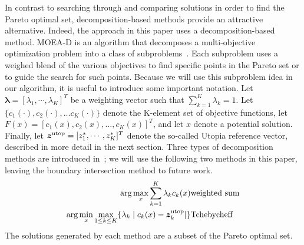 \documentclass{article}
\begin{document}
In contrast to searching through and comparing solutions in order to find the Pareto optimal set, decomposition-based methods provide an attractive alternative.  
Indeed, the approach in this paper uses a decomposition-based method.  
MOEA-D is an algorithm that decomposes a multi-objective optimization problem into a class of subproblems~\cite{4358754}.  
Each subproblem uses a weighed blend of the various objectives to find specific points in the Pareto set or to guide the search for such points.  
Because we  will use this subproblem idea in our algorithm, it is useful to introduce some important notation.
Let $ \bm{\lambda} = [ \lambda_{1} , \cdots , \lambda_{K}  ]^{T} $ be a weighting vector such that $ \sum_{k=1}^{K} \lambda_{k} = 1 $.  Let $\{c_{1}(\cdot), c_{2}(\cdot), \ldots c_{K}(\cdot)\}$ denote the K-element set of objective functions, let $F(x) = [c_{1}(x), c_{2}(x), \ldots, c_{K}(x)]^T$, and let $x$ denote a potential solution.  Finally, let $ \bm{z}^{\rm utop} = [z^{*}_{1}, \cdots , z^{*}_{K}]^{T} $ denote the so-called Utopia reference vector, described in more detail in the next section. 
Three types of decomposition methods are introduced in~\cite{4358754}; we will use the following two methods in this paper, leaving the boundary intersection method to future work.
\begin{eqnarray}
 \arg\max_x \sum_{k=1}^{K} \lambda_{k} c_{k} (x) & {\rm weighted \ sum} \label{eq:weighted}\\
 \arg\min_x\max_{1 \leq k \leq K}  \{ \lambda_{k} \mid c_{k}(x) - \bm{z}^{\rm utop}_{k}  | \} & {\rm Tchebycheff} \label{eq:Tchebycheff}%
\end{eqnarray}
The solutions generated by each method are a subset of the Pareto optimal set.
\end{document}
